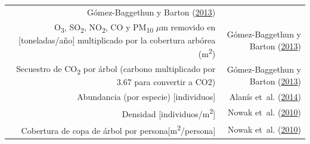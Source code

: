 \documentclass[12pt,a4paper,openany]{book}
\theoremstyle{definition}
\theoremstyle{definition}
\theoremstyle{definition}
\theoremstyle{remark}
\begin{document}
\begin{longtable}[]{@{}rr@{}}
\begin{minipage}[t]{0.31\columnwidth}
Gómez-Baggethun y Barton
(\protect\hyperlink{ref-gomez-baggethun_classifying_2013}{2013})\strut
\end{minipage}\tabularnewline
\begin{minipage}[t]{0.57\columnwidth}\raggedleft\strut
O\textsubscript{3}, SO\textsubscript{2}, NO\textsubscript{2}, CO y
PM\textsubscript{10} \(\mu\)m removido en {[}toneladas/año{]}
multiplicado por la cobertura arbórea (m\textsuperscript{2})\strut
\end{minipage} & \begin{minipage}[t]{0.31\columnwidth}\raggedleft\strut
Gómez-Baggethun y Barton
(\protect\hyperlink{ref-gomez-baggethun_classifying_2013}{2013})\strut
\end{minipage}\tabularnewline
\begin{minipage}[t]{0.57\columnwidth}\raggedleft\strut
Secuestro de CO\textsubscript{2} por árbol (carbono multiplicado por
3.67 para convertir a CO2)\strut
\end{minipage} & \begin{minipage}[t]{0.31\columnwidth}\raggedleft\strut
Gómez-Baggethun y Barton
(\protect\hyperlink{ref-gomez-baggethun_classifying_2013}{2013})\strut
\end{minipage}\tabularnewline
\begin{minipage}[t]{0.57\columnwidth}\raggedleft\strut
Abundancia (por especie) {[}individuos{]}\strut
\end{minipage} & \begin{minipage}[t]{0.31\columnwidth}\raggedleft\strut
Alanís et~al.
(\protect\hyperlink{ref-alanis_estructura_2014}{2014})\strut
\end{minipage}\tabularnewline
\begin{minipage}[t]{0.57\columnwidth}\raggedleft\strut
Densidad {[}individuos/m\textsuperscript{2}{]}\strut
\end{minipage} & \begin{minipage}[t]{0.31\columnwidth}\raggedleft\strut
Nowak et~al. (\protect\hyperlink{ref-nowak_sustaining_2010}{2010})\strut
\end{minipage}\tabularnewline
\begin{minipage}[t]{0.57\columnwidth}\raggedleft\strut
Cobertura de copa de árbol por
persona{[}m\textsuperscript{2}/persona{]}\strut
\end{minipage} & \begin{minipage}[t]{0.31\columnwidth}\raggedleft\strut
Nowak et~al. (\protect\hyperlink{ref-nowak_sustaining_2010}{2010})\strut
\end{minipage}\tabularnewline

\end{longtable}
\end{document}
